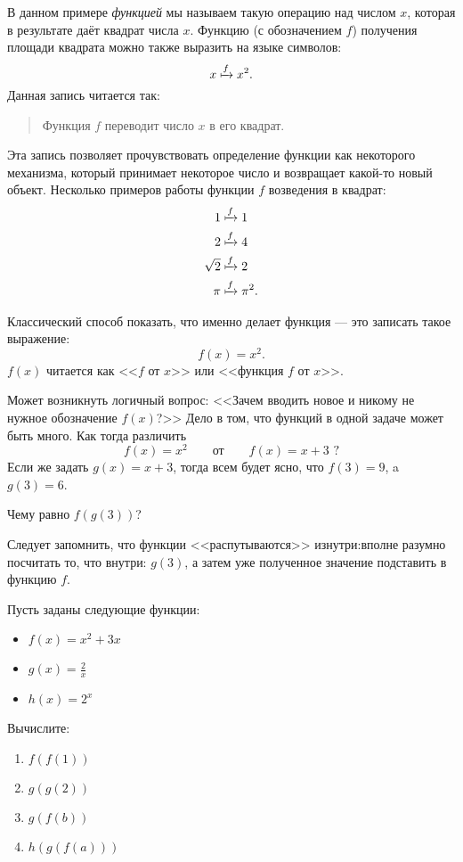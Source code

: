 \documentclass[11pt,fleqn]{book} %
\begin{document}
В данном примере \textit{функцией} мы называем такую операцию над числом $x$, которая в результате даёт квадрат числа $x$. Функцию (с обозначением $f$) получения площади квадрата можно также выразить на языке символов:
$$
x \xmapsto{f} x^2.
$$
Данная запись читается так:
\begin{quote}
Функция $f$ переводит число $x$ в его квадрат.
\end{quote}
Эта запись позволяет прочувствовать определение функции как некоторого механизма, который принимает некоторое число и возвращает какой-то новый объект.
Несколько примеров работы функции $f$ возведения в квадрат:
\begin{align*}
1 &\xmapsto{f} 1 \\
2 &\xmapsto{f} 4 \\
\sqrt 2 &\xmapsto{f} 2 \\
\pi &\xmapsto{f} \pi^2.
\end{align*}

Классический способ показать, что именно делает функция --- это записать такое выражение: $$f(x) = x^2.$$
$f(x)$ читается как <<$f$ от $x$>> или <<функция $f$ от $x$>>.

\begin{remark}
Может возникнуть логичный вопрос: <<Зачем вводить новое и никому не нужное обозначение $f(x)$?>> Дело в том, что функций в одной задаче может быть много.
Как тогда различить $$f(x) = x^2 \qquad \text{от} \qquad f(x) = x + 3 \text{ ?}$$
Если же задать $g(x) = x+3$, тогда всем будет ясно, что $f(3) = 9$, a $g(3) = 6$.
\end{remark}

\begin{example}
Чему равно $f(g(3))$?

Следует запомнить, что функции <<распутываются>> изнутри:вполне разумно посчитать то, что внутри: $g(3)$, а затем уже полученное значение подставить в функцию $f$.

\end{example}

\begin{exercise}
Пусть заданы следующие функции:
\begin{itemize}
\item $f(x) = x^2 + 3x$
\item $g(x) = \frac{2}{x}$
\item $h(x) = 2^x$
\end{itemize}

Вычислите:
\begin{enumerate}
\item $f(f(1))$
\item $g(g(2))$
\item $g(f(b))$
\item $h(g(f(a)))$
\end{enumerate}
\end{exercise}
\end{document}
